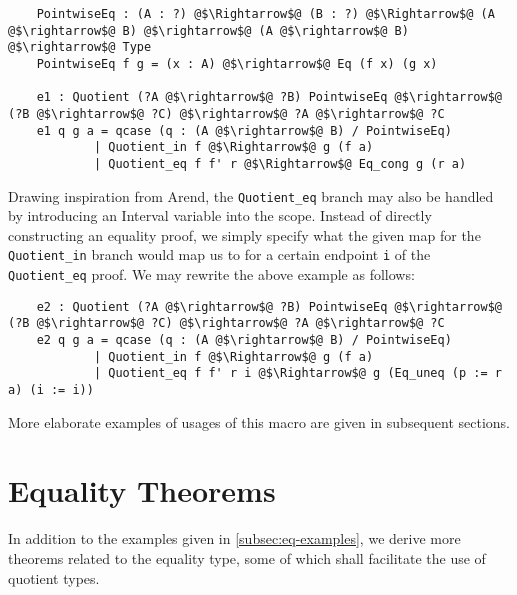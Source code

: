 \documentclass[12pt,twoside,maitrise]{dms}
\theoremstyle{definition}
\numberwithin{equation}{section}
\numberwithin{table}{chapter}
\numberwithin{figure}{chapter}
\newcommand\id[1] {\texttt{#1}}
\begin{document}
\begin{verbatim}
    PointwiseEq : (A : ?) @$\Rightarrow$@ (B : ?) @$\Rightarrow$@ (A @$\rightarrow$@ B) @$\rightarrow$@ (A @$\rightarrow$@ B) @$\rightarrow$@ Type
    PointwiseEq f g = (x : A) @$\rightarrow$@ Eq (f x) (g x)

    e1 : Quotient (?A @$\rightarrow$@ ?B) PointwiseEq @$\rightarrow$@ (?B @$\rightarrow$@ ?C) @$\rightarrow$@ ?A @$\rightarrow$@ ?C
    e1 q g a = qcase (q : (A @$\rightarrow$@ B) / PointwiseEq)
            | Quotient_in f @$\Rightarrow$@ g (f a)
            | Quotient_eq f f' r @$\Rightarrow$@ Eq_cong g (r a)
\end{verbatim}

Drawing inspiration from Arend, the \id{Quotient\_eq} branch may also be handled
by introducing an Interval variable into the scope. Instead of directly
constructing an equality proof, we simply specify what the given map for the
\id{Quotient\_in} branch would map us to for a certain endpoint \id{i} of the
\id{Quotient\_eq} proof. We may rewrite the above example as follows:


\begin{verbatim}
    e2 : Quotient (?A @$\rightarrow$@ ?B) PointwiseEq @$\rightarrow$@ (?B @$\rightarrow$@ ?C) @$\rightarrow$@ ?A @$\rightarrow$@ ?C
    e2 q g a = qcase (q : (A @$\rightarrow$@ B) / PointwiseEq)
            | Quotient_in f @$\Rightarrow$@ g (f a)
            | Quotient_eq f f' r i @$\Rightarrow$@ g (Eq_uneq (p := r a) (i := i))
\end{verbatim}

More elaborate examples of usages of this macro are given in subsequent
sections.

\chapter{Equality Theorems}\label{ch:eq-theorems}
In addition to the examples given in \autoref{subsec:eq-examples}, we derive
more theorems related to the equality type, some of which shall facilitate the
use of quotient types.
\end{document}

